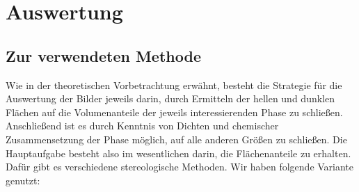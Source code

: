 \documentclass[german,  %
parskip=full,  %
]{scrartcl}
\begin{document}
\newpage
\section{Auswertung}
\subsection{Zur verwendeten Methode}
Wie in der theoretischen Vorbetrachtung erwähnt, besteht die Strategie für die Auswertung der Bilder jeweils darin, durch Ermitteln der hellen und dunklen Flächen auf die Volumenanteile der jeweils interessierenden Phase zu schließen. Anschließend ist es durch Kenntnis von Dichten und chemischer Zusammensetzung der Phase möglich, auf alle anderen Größen zu schließen. Die Hauptaufgabe besteht also im wesentlichen darin, die Flächenanteile zu erhalten. Dafür gibt es verschiedene stereologische Methoden. Wir haben folgende Variante genutzt:
\end{document}
